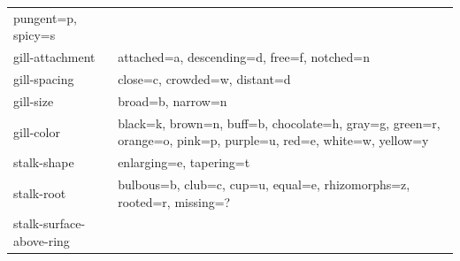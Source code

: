 \documentclass[
]{article}
\begin{document}
\begin{longtable}[]{@{}ll@{}}
\begin{minipage}[t]{0.47\columnwidth}
pungent=p, spicy=s\strut
\end{minipage}\tabularnewline
\begin{minipage}[t]{0.47\columnwidth}\raggedright
gill-attachment\strut
\end{minipage} & \begin{minipage}[t]{0.47\columnwidth}\raggedright
attached=a, descending=d, free=f, notched=n\strut
\end{minipage}\tabularnewline
\begin{minipage}[t]{0.47\columnwidth}\raggedright
gill-spacing\strut
\end{minipage} & \begin{minipage}[t]{0.47\columnwidth}\raggedright
close=c, crowded=w, distant=d\strut
\end{minipage}\tabularnewline
\begin{minipage}[t]{0.47\columnwidth}\raggedright
gill-size\strut
\end{minipage} & \begin{minipage}[t]{0.47\columnwidth}\raggedright
broad=b, narrow=n\strut
\end{minipage}\tabularnewline
\begin{minipage}[t]{0.47\columnwidth}\raggedright
gill-color\strut
\end{minipage} & \begin{minipage}[t]{0.47\columnwidth}\raggedright
black=k, brown=n, buff=b, chocolate=h, gray=g, green=r, orange=o,
pink=p, purple=u, red=e, white=w, yellow=y\strut
\end{minipage}\tabularnewline
\begin{minipage}[t]{0.47\columnwidth}\raggedright
stalk-shape\strut
\end{minipage} & \begin{minipage}[t]{0.47\columnwidth}\raggedright
enlarging=e, tapering=t\strut
\end{minipage}\tabularnewline
\begin{minipage}[t]{0.47\columnwidth}\raggedright
stalk-root\strut
\end{minipage} & \begin{minipage}[t]{0.47\columnwidth}\raggedright
bulbous=b, club=c, cup=u, equal=e, rhizomorphs=z, rooted=r,
missing=?\strut
\end{minipage}\tabularnewline
\begin{minipage}[t]{0.47\columnwidth}\raggedright
stalk-surface-above-ring\strut
\end{minipage} & \begin{minipage}[t]{0.47\columnwidth}\raggedright

\end{minipage}
\end{longtable}
\end{document}
